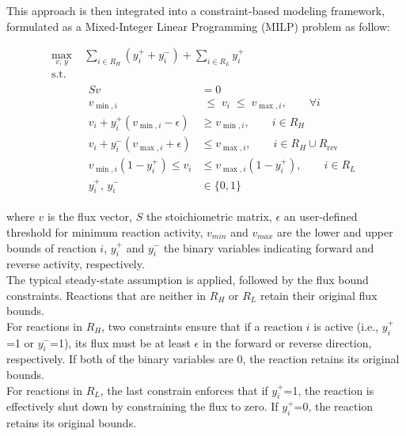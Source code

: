 This approach is then integrated into a constraint-based modeling framework, formulated as a Mixed-Integer Linear Programming (\gls{MILP}) problem as follow: 

\begin{equation}
    \label{eq:iMAT}
    \begin{aligned}
        \max_{v,\,y} \;& 
        \sum_{i \in R_H} (y_i^{+} + y_i^{-})
        + \sum_{i \in R_L} y_i^{+} \\[10pt]
    \text{s.t.} \\&
    \begin{aligned}
        S v &= 0 \\[6pt]
        v_{\min,i} &\;\le\; v_i \;\le\; v_{\max,i},
        \qquad \forall i
        \\[0.7em]
            v_i + y_i^{+}(v_{\min,i}-\epsilon) &\ge v_{\min,i},
            \qquad i \in R_H \\[6pt]
            v_i + y_i^{-}(v_{\max,i}+\epsilon) &\le v_{\max,i},
            \qquad i \in R_H \cup R_{\mathrm{rev}} \\[6pt]
            v_{\min,i}(1 - y_i^{+}) \le v_i &\le
            v_{\max,i}(1 - y_i^{+}), \qquad i \in R_L \\[6pt]
            y_i^{+},\, y_i^{-} &\in \{0,1\}
    \end{aligned}
    \end{aligned}
\end{equation}

where $v$ is the flux vector, $S$ the stoichiometric matrix, $\epsilon$ 
an user-defined threshold for minimum reaction activity, $v_{min}$ and $v_{max}$ 
are the lower and upper bounds of reaction $i$, $y_i^+$ and $y_i^-$ the binary variables indicating forward and reverse activity, respectively. 
\\
The typical steady-state assumption is applied, followed by the flux bound constraints. Reactions that are neither in $R_H$ or $R_L$ retain their original flux bounds.
\\

For reactions in $R_H$, two constraints ensure that if a reaction $i$ is active (i.e., $y_i^+$=1 or $y_i^-$=1), its flux must 
be at least $\epsilon$ in the forward or reverse direction, respectively. If both of the binary variables are 0, the reaction retains its original bounds. 
\\

For reactions in $R_L$, the last constrain enforces that if $y_i^+$=1, the reaction is effectively shut down by constraining the flux to zero. If
$y_i^+$=0, the reaction retains its original bounds.
\\

